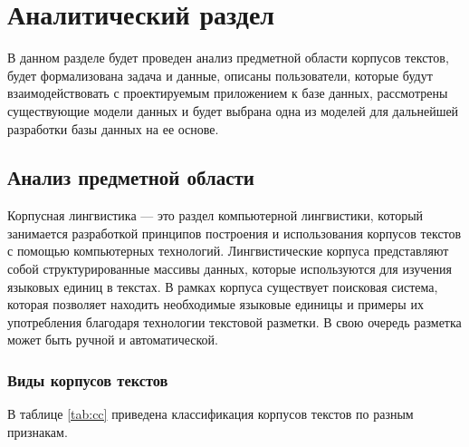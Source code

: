 \section{Аналитический раздел}

В данном разделе будет проведен анализ предметной области корпусов текстов, будет формализована задача и данные, описаны пользователи, которые будут взаимодействовать с проектируемым приложением к базе данных, рассмотрены существующие модели данных и будет выбрана одна из моделей для дальнейшей разработки базы данных на ее основе.

\subsection{Анализ предметной области}

Корпусная лингвистика — это раздел компьютерной лингвистики, который занимается разработкой принципов построения и использования корпусов текстов с помощью компьютерных технологий.
Лингвистические корпуса представляют собой структурированные массивы данных, которые используются для изучения языковых единиц в текстах.
В рамках корпуса существует поисковая система, которая позволяет находить необходимые языковые единицы и примеры их употребления благодаря технологии текстовой разметки.
В свою очередь разметка может быть ручной и автоматической.~\cite{butenko2022}

\subsubsection*{Виды корпусов текстов}

В таблице \ref{tab:cc} приведена классификация корпусов текстов по разным признакам.

